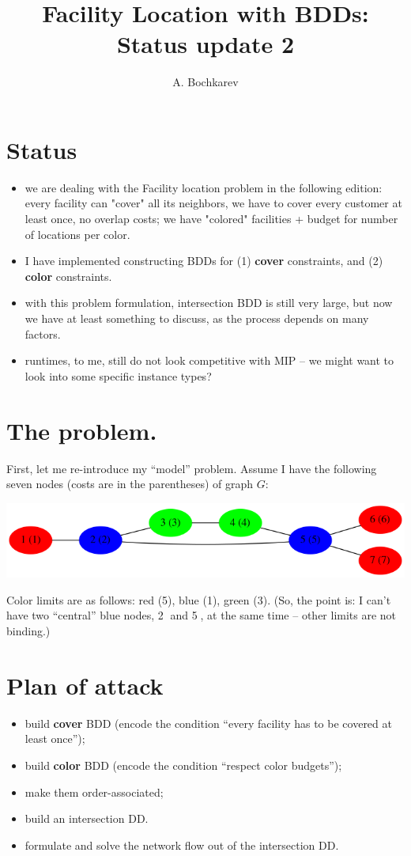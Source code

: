 \documentclass[11pt]{article}
\author{A. Bochkarev}
\date{}
\title{Facility Location with BDDs: Status update 2}
\begin{document}
\maketitle

\section{Status}
\label{sec:orgf8c8d9f}
\begin{itemize}
\item we are dealing with the Facility location problem in the following edition: every facility can
"cover" all its neighbors, we have to cover every customer at least once, no
overlap costs; we have "colored" facilities + budget for number of locations
per color.
\item I have implemented constructing BDDs for (1) \textbf{cover} constraints, and (2) \textbf{color} constraints.
\item with this problem formulation, intersection BDD is still very large, but now
we have at least something to discuss, as the process depends on many factors.
\item runtimes, to me, still do not look competitive with MIP -- we might want to
look into some specific instance types?
\end{itemize}

\section{The problem.}
\label{sec:org2728a9d}
First, let me re-introduce my ``model'' problem. Assume I have the following
seven nodes (costs are in the parentheses) of graph \(G\):
\begin{center}
\includegraphics[width=.9\linewidth]{problem_LR.png}
\end{center}

Color limits are as follows: red (5), blue (1), green (3). (So, the point is: I
can't have two ``central'' blue nodes, \textcircled{2} and \textcircled{5}, at the
same time -- other limits are not binding.)

\section{Plan of attack}
\label{sec:org52d8665}
\begin{itemize}
\item build \textbf{cover} BDD (encode the condition ``every facility has to be covered at least once'');
\item build \textbf{color} BDD (encode the condition ``respect color budgets'');
\item make them order-associated;
\item build an intersection DD.
\item formulate and solve the network flow out of the intersection DD.
\end{itemize}
\end{document}
